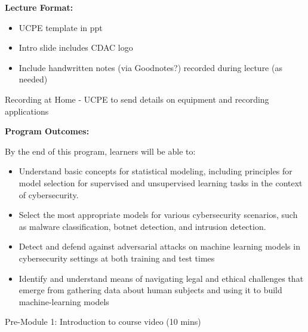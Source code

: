 \documentclass[12pt]{article}
\renewcommand{\_}{\kern-1.5pt\textunderscore\kern-1.5pt}
\begin{document}
\textbf{Lecture Format: }\par

\begin{itemize}
	\item UCPE template in ppt \par

	\item Intro slide includes CDAC logo \par

	\item Include handwritten notes (via Goodnotes?) recorded during lecture (as needed)
\end{itemize}\par



Recording at Home - UCPE to send details on equipment and recording applications \par



\textbf{Program Outcomes:} \par



\setlength{\parskip}{12.0pt}

By the end of this program, learners will be able to:\par

\begin{itemize}
\item Understand basic concepts for statistical modeling, including principles for model selection for supervised and unsupervised learning tasks in the context of cybersecurity.  
\item Select the most appropriate models for various cybersecurity scenarios, such as malware classification, botnet detection, and intrusion detection.
\item  Detect and defend against adversarial attacks on machine learning models in cybersecurity settings at both training and test times
\item  Identify and understand means of navigating legal and ethical challenges that emerge from gathering data about human subjects and using it to build machine-learning models
\end{itemize}

Pre-Module 1: Introduction to course video (10 mins)\par
\end{document}
